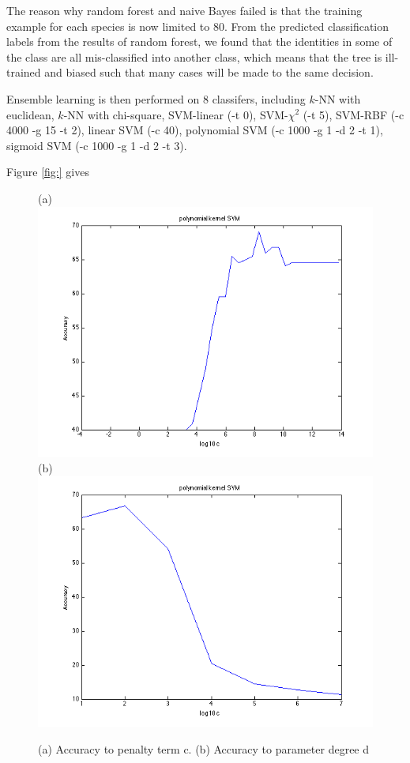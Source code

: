 \documentclass{article} %
\begin{document}
The reason why random forest and naive Bayes failed is that the training example for each species is now limited to 80. From the predicted classification labels from the results of random forest, we found that the identities in some of the class are all mis-classified into another class, which means that the tree is ill-trained and biased such that many cases will be made to the same decision. 



Ensemble learning is then performed on 8 classifers, including $k$-NN with euclidean, $k$-NN with chi-square, SVM-linear (-t 0), SVM-$\chi^2$ (-t 5), SVM-RBF (-c 4000 -g 15 -t 2), linear SVM (-c 40), polynomial SVM (-c 1000 -g 1 -d 2 -t 1), sigmoid SVM (-c 1000 -g 1 -d 2 -t 3). 

Figure \ref{fig:} gives 

\begin{figure}[ht!]
    \centering
    {(a)\includegraphics[width=0.38\linewidth]{../Figure/Poly_cost_accuracy}
    (b)\includegraphics[width=0.38\linewidth]{../Figure/Poly_degree_accuracy}}
    \caption{(a) Accuracy to penalty term c. (b) Accuracy to parameter degree d}
    \label{fig:poly}
\end{figure}



\end{document}

